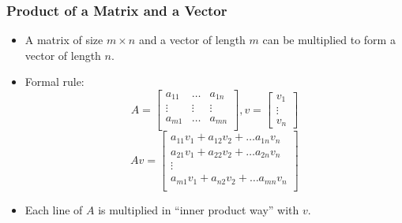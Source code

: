\documentclass[8pt]{beamer}
\begin{document}
\begin{frame}
  \frametitle{Product of a Matrix and a Vector}
  \begin{itemize}
  \item A matrix of size $m\times n$ and a vector of length $m$ can be multiplied to form a vector of length $n$.
  \item Formal rule:
    $$
    A =
    \begin{bmatrix}
      a_{11}&\dots& a_{1n}\\
      \vdots & \vdots & \vdots\\
      a_{m1}&\dots& a_{mn}\\
    \end{bmatrix},
    v =
    \begin{bmatrix}
      v_1\\\vdots\\ v_n
    \end{bmatrix}
    $$
    $$
    A v =
    \begin{bmatrix}
      a_{11} v_1 + a_{12}v_2 + \dots a_{1n} v_n\\
      a_{21} v_1 + a_{22}v_2 + \dots a_{2n} v_n\\
      \vdots\\
      a_{m1} v_1 + a_{n2}v_2 + \dots a_{mn} v_n\\
    \end{bmatrix}
    $$
    \item Each line of $A$ is multiplied in ``inner product way'' with $v$.
  \end{itemize}
\end{frame}
\end{document}
